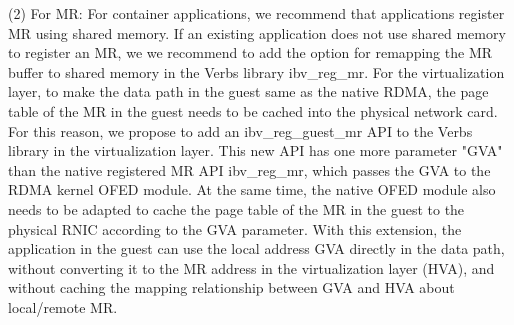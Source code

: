 (2) For MR: For container applications, we recommend that applications register MR using shared memory. If an existing application does not use shared memory to register an MR, we  we recommend to add the option for remapping the MR buffer to shared memory in the Verbs library ibv\_reg\_mr. For the virtualization layer, to make the data path in the guest same as the native RDMA, the page table of the MR in the guest needs to be cached into the physical network card. For this reason, we propose to add an ibv\_reg\_guest\_mr API to the Verbs library in the virtualization layer. This new API has one more parameter "GVA" than the native registered MR API ibv\_reg\_mr, which passes the GVA to the RDMA kernel OFED module. At the same time, the native OFED module also needs to be adapted to cache the page table of the MR in the guest to the physical RNIC according to the GVA parameter. With this extension, the application in the guest can use the local address GVA directly in the data path, without converting it to the MR address in the virtualization layer (HVA), and without caching the mapping relationship between GVA and HVA about local/remote MR.